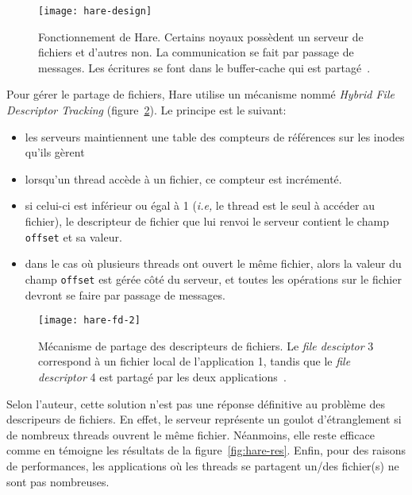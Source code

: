       \begin{figure}[ht]
        \centering
        \texttt{[image: hare-design]}
        \caption{Fonctionnement de Hare. Certains noyaux possèdent un serveur de
          fichiers et d'autres non. La communication se fait par passage de
          messages. Les écritures se font dans le buffer-cache qui est
          partagé~\citep{gruenwald2014providing}.}
        \label{fig:hare-design}
      \end{figure}

      Pour gérer le partage de fichiers, Hare utilise un mécanisme nommé
      \textit{Hybrid File Descriptor Tracking} (figure~\ref{fig:hare-fd}). Le
      principe est le suivant:
      \begin{itemize}
        \item les serveurs maintiennent une table des compteurs de références
          sur les inodes qu'ils gèrent
        \item lorsqu'un thread accède à un fichier, ce compteur est incrémenté.
        \item si celui-ci est inférieur ou égal à 1 (\textit{i.e,} le thread est
          le seul à accéder au fichier), le descripteur de fichier que lui
          renvoi le serveur contient le champ \texttt{offset} et sa valeur.
        \item dans le cas où plusieurs threads ont ouvert le même fichier, alors
          la valeur du champ \texttt{offset} est gérée côté du serveur, et
          toutes les opérations sur le fichier devront se faire par passage de
          messages.
      \end{itemize}
      \begin{figure}[ht]
        \centering
        \texttt{[image: hare-fd-2]}
        \caption{Mécanisme de partage des descripteurs de fichiers. Le
          \textit{file desciptor} 3 correspond à un fichier local de
          l'application 1, tandis que le \textit{file descriptor} 4 est partagé
          par les deux applications~\citep{gruenwald2014providing}.}
        \label{fig:hare-fd}
      \end{figure}

      Selon l'auteur, cette solution n'est pas une réponse définitive au
      problème des descripeurs de fichiers. En effet, le serveur représente un
      goulot d'étranglement si de nombreux threads ouvrent le même
      fichier. Néanmoins, elle reste efficace comme en témoigne les résultats de
      la figure~\ref{fig:hare-res}. Enfin, pour des raisons de performances, les
      applications où les threads se partagent un/des fichier(s) ne sont pas
      nombreuses.\\


